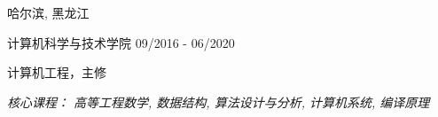 \vspace{-6.0mm}

\begin{cventries}
\vspace{-1.5mm}

\cveducation
{}
{哈尔滨, 黑龙江}

\cvsubeducation
{计算机科学与技术学院}
{09/2016 - 06/2020}
{
    \begin{cvitems}
    \item {计算机工程，主修}
    \item {\itshape{核心课程： 高等工程数学, 数据结构, 算法设计与分析, 计算机系统, 编译原理}}
    \end{cvitems}
}

\end{cventries}